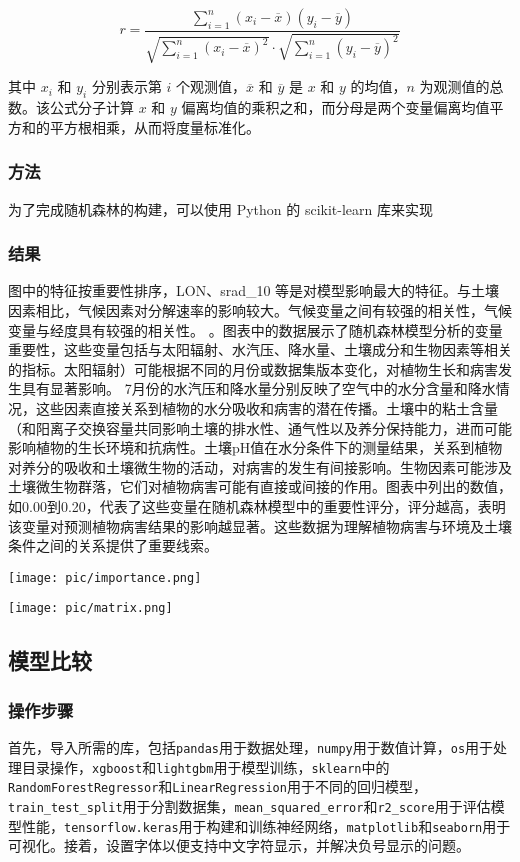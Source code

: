 \documentclass{article}
\begin{document}
	\[
	r = \frac{\sum_{i=1}^{n} (x_i - \overline{x})(y_i - \overline{y})}{\sqrt{\sum_{i=1}^{n} (x_i - \overline{x})^2} \cdot \sqrt{\sum_{i=1}^{n} (y_i - \overline{y})^2}}
	\]
	
	其中 \( x_i \) 和 \( y_i \) 分别表示第 \( i \) 个观测值，\( \overline{x} \) 和 \( \overline{y} \) 是 \( x \) 和 \( y \) 的均值，\( n \) 为观测值的总数。该公式分子计算 \( x \) 和 \( y \) 偏离均值的乘积之和，而分母是两个变量偏离均值平方和的平方根相乘，从而将度量标准化。
	
		\subsubsection{方法}
	
		为了完成随机森林的构建，可以使用 Python 的 scikit-learn 库来实现
	\subsubsection{结果}
	
	图中的特征按重要性排序，LON、srad\_10 等是对模型影响最大的特征。与土壤因素相比，气候因素对分解速率的影响较大。气候变量之间有较强的相关性，气候变量与经度具有较强的相关性。
	。图表中的数据展示了随机森林模型分析的变量重要性，这些变量包括与太阳辐射、水汽压、降水量、土壤成分和生物因素等相关的指标。太阳辐射）可能根据不同的月份或数据集版本变化，对植物生长和病害发生具有显著影响。
	7月份的水汽压和降水量分别反映了空气中的水分含量和降水情况，这些因素直接关系到植物的水分吸收和病害的潜在传播。土壤中的粘土含量（和阳离子交换容量共同影响土壤的排水性、通气性以及养分保持能力，进而可能影响植物的生长环境和抗病性。土壤pH值在水分条件下的测量结果，关系到植物对养分的吸收和土壤微生物的活动，对病害的发生有间接影响。生物因素可能涉及土壤微生物群落，它们对植物病害可能有直接或间接的作用。图表中列出的数值，如0.00到0.20，代表了这些变量在随机森林模型中的重要性评分，评分越高，表明该变量对预测植物病害结果的影响越显著。这些数据为理解植物病害与环境及土壤条件之间的关系提供了重要线索。
	
	\par
\texttt{[image: pic/importance.png]} %
\par
\texttt{[image: pic/matrix.png]} %

	\subsection{模型比较}

\subsubsection{操作步骤}
首先，导入所需的库，包括\texttt{pandas}用于数据处理，\texttt{numpy}用于数值计算，\texttt{os}用于处理目录操作，\texttt{xgboost}和\texttt{lightgbm}用于模型训练，\texttt{sklearn}中的\texttt{RandomForestRegressor}和\texttt{LinearRegression}用于不同的回归模型，\texttt{train\_test\_split}用于分割数据集，\texttt{mean\_squared\_error}和\texttt{r2\_score}用于评估模型性能，\texttt{tensorflow.keras}用于构建和训练神经网络，\texttt{matplotlib}和\texttt{seaborn}用于可视化。接着，设置字体以便支持中文字符显示，并解决负号显示的问题。
\end{document}
